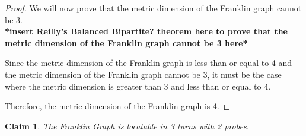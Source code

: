 \documentclass[11pt]{article}
\newtheorem{clm}{Claim}
\begin{document}
\begin{proof}
		We will now prove that the metric dimension of the Franklin graph cannot be 3. \\
		\textbf{*insert Reilly's Balanced Bipartite? theorem here to prove that the metric dimension of the Franklin graph cannot be 3 here* }
		
		Since the metric dimension of the Franklin graph is less than or equal to 4 and the metric dimension of the Franklin graph cannot be 3, it must be the case where the metric dimension is greater than 3 and less than or equal to 4.
		
		Therefore, the metric dimension of the Franklin graph is 4.
	\end{proof}
	
	\begin{clm}
		The Franklin Graph is locatable in 3 turns with 2 probes.
	\end{clm}
\end{document}
